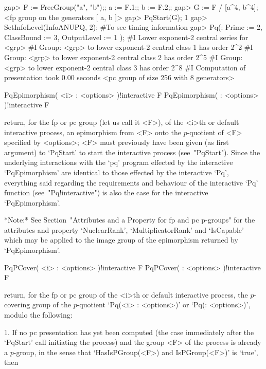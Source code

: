 \beginexample
gap> F := FreeGroup("a", "b");; a := F.1;; b := F.2;;
gap> G := F / [a^4, b^4];
<fp group on the generators [ a, b ]>
gap> PqStart(G);
1
gap> SetInfoLevel(InfoANUPQ, 2); #To see timing information               
gap> Pq(: Prime := 2, ClassBound := 3, OutputLevel := 1 );
#I  Lower exponent-2 central series for <grp>
#I  Group: <grp> to lower exponent-2 central class 1 has order 2^2
#I  Group: <grp> to lower exponent-2 central class 2 has order 2^5
#I  Group: <grp> to lower exponent-2 central class 3 has order 2^8
#I  Computation of presentation took 0.00 seconds
<pc group of size 256 with 8 generators>
\endexample

\>PqEpimorphism( <i> : <options> )!{interactive} F
\>PqEpimorphism( : <options> )!{interactive} F

return, for  the fp  or pc group (let us  call it <F>),  of the  <i>th or
default interactive  {\ANUPQ} process, an  epimorphism from <F>  onto the
$p$-quotient of <F> specified by <options>; <F> must previously have been
given (as first argument) to  `PqStart' to start the interactive {\ANUPQ}
process (see~"PqStart"). Since the  underlying interactions with the `pq'
program  effected by  the  interactive `PqEpimorphism'  are identical  to
those  effected by the  interactive `Pq',  everything said  regarding the
requirements   and   behaviour   of   the   interactive   `Pq'   function
(see~"Pq!interactive")   is   also   the   case   for   the   interactive
`PqEpimorphism'.

*Note:*
See Section~"Attributes and a Property for fp and pc  p-groups"  for  the
attributes   and   property   `NuclearRank',   `MultiplicatorRank'    and
`IsCapable' which may be applied to the image group  of  the  epimorphism
returned by `PqEpimorphism'.

\>PqPCover( <i> : <options> )!{interactive} F
\>PqPCover( : <options> )!{interactive} F

return,  for the  fp or  pc  group of  the <i>th  or default  interactive
{\ANUPQ} process,  the $p$-covering group  of the $p$-quotient  `Pq(<i> :
<options>)' or `Pq(: <options>)', modulo the following:

\beginlist%

\item{1.}
If no pc presentation has yet been computed (the case  immediately  after
the `PqStart' call initiating the process)  and  the  group  <F>  of  the
process is already a $p$-group, in the sense that  `HasIsPGroup(<F>)  and
IsPGroup(<F>)' is `true', then


